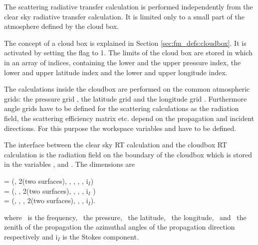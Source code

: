 \label{sec:scattering:scat_meth_rt}

The scattering radiative transfer calculation is performed
independently from the clear sky radiative transfer calculation. It is
limited only to a small part of the atmosphere defined by the cloud box.

\label{sec:scattering:cloudbox}


The concept of a cloud box is explained in Section
\ref{sec:fm_defs:cloudbox}. It is activated by setting the flag
 to 1. The
limits of the cloud box are stored in 
which in an array of indices, containing the lower and the upper
pressure index, the lower and upper latitude index and the lower and
upper longitude index. 

The calculations inside the cloudbox are performed on the common 
atmospheric grids: the pressure grid
, the latitude grid  
and the longitude grid . 
Furthermore angle grids have to be defined for the scattering calculations  
as the radiation field, the scattering efficiency matrix etc. depend
on the propagation and incident directions. For this purpose  the workspace  
variables  and 
have to be defined.

The interface between the clear sky RT calculation and the cloudbox RT
calculation is the radiation field on the boundary of the cloudbox
which is stored
in the variables ,  and
. The dimensions are 
\begin{center}
   =  (\Frq, 2(two surfaces), \Lat, \Lon, \ScaZa, \ScaAa, i$_I$)\\
  =  (\Frq, \Prs, 2(two surfaces), \Lon, \ScaZa,
\ScaAa, i$_I$ )\\
  =  (\Frq, \Prs, \Lat, 2(two surfaces), \ScaZa,
\ScaAa, i$_I$).
\end{center}
where \Frq\ is the frequency, \Prs\ the pressure, \Lat\ the latitude,
\Lon\ the longitude, \ScaZa\ and \ScaAa\  the zenith of the propagation
the azimuthal angles of the propagation direction respectively and
i$_I$ is the Stokes component. 

